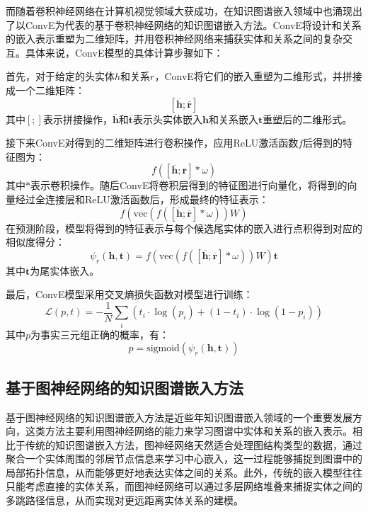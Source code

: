而随着卷积神经网络在计算机视觉领域大获成功，在知识图谱嵌入领域中也涌现出了以ConvE为代表的基于卷积神经网络的知识图谱嵌入方法。ConvE将设计和关系的嵌入表示重塑为二维矩阵，并用卷积神经网络来捕获实体和关系之间的复杂交互。具体来说，ConvE模型的具体计算步骤如下：

首先，对于给定的头实体$h$和关系$r$，ConvE将它们的嵌入重塑为二维形式，并拼接成一个二维矩阵：
\begin{equation}
  \left[\overline{\boldsymbol{h}};\overline{\boldsymbol{r}}\right] 
\end{equation}
其中$\left[;\right]$表示拼接操作，$\overline{\boldsymbol{h}}$和$\overline{\boldsymbol{t}}$表示头实体嵌入$\boldsymbol{h}$和关系嵌入$\boldsymbol{t}$重塑后的二维形式。

接下来ConvE对得到的二维矩阵进行卷积操作，应用ReLU激活函数$f$后得到的特征图为：
\begin{equation}
  f\left(\left[\overline{\boldsymbol{h}};\overline{\boldsymbol{r}}\right]\ast \omega\right)
\end{equation}
其中$\ast$表示卷积操作。随后ConvE将卷积层得到的特征图进行向量化，将得到的向量经过全连接层和ReLU激活函数后，形成最终的特征表示：
\begin{equation}
  f\left(\mbox{vec}\left(f\left(\left[\overline{\boldsymbol{h}};\overline{\boldsymbol{r}}\right]\ast \omega\right)\right)W\right)
\end{equation}
在预测阶段，模型将得到的特征表示与每个候选尾实体的嵌入进行点积得到对应的相似度得分：
\begin{equation}
  \psi_r(\boldsymbol{h},\boldsymbol{t})=f\left(\mbox{vec}\left(f\left(\left[\overline{\boldsymbol{h}};\overline{\boldsymbol{r}}\right]\ast \omega\right)\right)W\right)\boldsymbol{t}
\end{equation}
其中$\boldsymbol{t}$为尾实体嵌入。

最后，ConvE模型采用交叉熵损失函数对模型进行训练：
\begin{equation}
  \mathcal{L} (p,t)=-\frac{1}{N}\sum_i(t_i\cdot \log (p_i)+(1-t_i)\cdot\log(1-p_i))
\end{equation}
其中$p$为事实三元组正确的概率，有：
\begin{equation}
  p=\mbox{sigmoid}(\psi_r(\boldsymbol{h},\boldsymbol{t}))
\end{equation}

\subsection{基于图神经网络的知识图谱嵌入方法}
基于图神经网络的知识图谱嵌入方法是近些年知识图谱嵌入领域的一个重要发展方向，这类方法主要利用图神经网络的能力来学习图谱中实体和关系的嵌入表示。相比于传统的知识图谱嵌入方法，图神经网络天然适合处理图结构类型的数据，通过聚合一个实体周围的邻居节点信息来学习中心嵌入，这一过程能够捕捉到图谱中的局部拓扑信息，从而能够更好地表达实体之间的关系。此外，传统的嵌入模型往往只能考虑直接的实体关系，而图神经网络可以通过多层网络堆叠来捕捉实体之间的多跳路径信息，从而实现对更远距离实体关系的建模。

